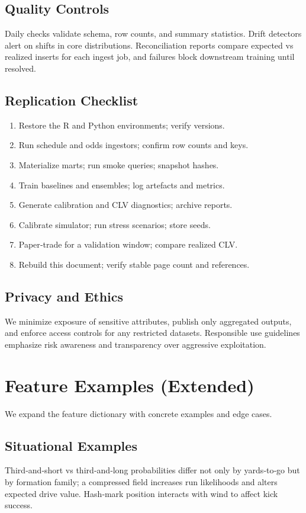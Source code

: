\documentclass[12pt]{report}  %
\numberwithin{equation}{section}
\theoremstyle{plain}
\theoremstyle{definition}
\theoremstyle{remark}
\begin{document}
\section{Quality Controls}
Daily checks validate schema, row counts, and summary statistics. Drift detectors alert on shifts in core distributions. Reconciliation reports compare expected vs realized inserts for each ingest job, and failures block downstream training until resolved.

\section{Replication Checklist}
\begin{enumerate}
  \item Restore the R and Python environments; verify versions.
  \item Run schedule and odds ingestors; confirm row counts and keys.
  \item Materialize marts; run smoke queries; snapshot hashes.
  \item Train baselines and ensembles; log artefacts and metrics.
  \item Generate calibration and CLV diagnostics; archive reports.
  \item Calibrate simulator; run stress scenarios; store seeds.
  \item Paper‑trade for a validation window; compare realized CLV.
  \item Rebuild this document; verify stable page count and references.
\end{enumerate}

\section{Privacy and Ethics}
We minimize exposure of sensitive attributes, publish only aggregated outputs, and enforce access controls for any restricted datasets. Responsible use guidelines emphasize risk awareness and transparency over aggressive exploitation.


\chapter{Feature Examples (Extended)}
We expand the feature dictionary with concrete examples and edge cases.

\section{Situational Examples}
Third‑and‑short vs third‑and‑long probabilities differ not only by yards‑to‑go but by formation family; a compressed field increases run likelihoods and alters expected drive value. Hash‑mark position interacts with wind to affect kick success.
\end{document}
